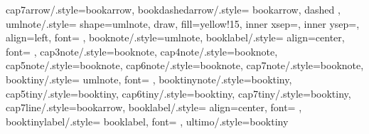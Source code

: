 {        cap7arrow/.style={bookarrow},
        bookdashedarrow/.style={
                bookarrow,
                dashed
            },
        umlnote/.style={
            shape=umlnote,
            draw,
            fill=yellow!15,
            inner xsep=\StyleXInnerSep,
            inner ysep=\StyleYInnerSep,
            align=left,
            font=\footnotesize
        },
        booknote/.style={umlnote},
        booklabel/.style={
                align=center,
                font=\footnotesize
            },
        cap3note/.style={booknote},
        cap4note/.style={booknote},
        cap5note/.style={booknote},
        cap6note/.style={booknote},
        cap7note/.style={booknote},
        booktiny/.style={
            umlnote,
            font=\scriptsize
        },
        booktinynote/.style={booktiny},
        cap5tiny/.style={booktiny},
        cap6tiny/.style={booktiny},
        cap7tiny/.style={booktiny},
        cap7line/.style={bookarrow},
        booklabel/.style={
            align=center,
            font=\footnotesize
        },
        booktinylabel/.style={
            booklabel,
            font=\scriptsize
        },
        ultimo/.style={booktiny}
}

